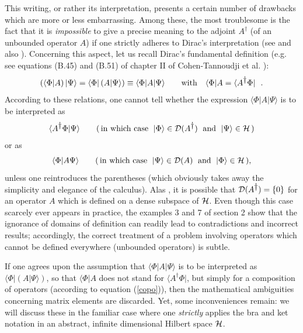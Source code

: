 \documentclass[12pt]{report}
\begin{document}
This writing, or rather its interpretation, 
presents a certain number of drawbacks 
which are more or less embarrassing. 
Among these, the most troublesome is the fact that it is 
{\em impossible} to give a precise meaning to the adjoint 
$A^{\dag}$ (of an unbounded operator $A$) if one strictly adheres
to Dirac's interpretation (see \cite{grau} and also \cite{fano}).
Concerning this aspect, let us recall Dirac's fundamental definition 
(e.g. see equations (B.45)
and (B.51) of chapter II of Cohen-Tannoudji et al. \cite{ct}):
\begin{equation}
\label{cohe}
\left( \langle \Phi | A \right) | \Psi \rangle =
\langle \Phi | \left( A  | \Psi \rangle \right) \equiv
\langle \Phi |  A  | \Psi \rangle
\qquad {\rm with} \quad
\langle \Phi | A  = \langle A^{\dag} \Phi |
\ \ .
\end{equation}
According to these relations, one cannot tell whether 
the expression 
$\langle \Phi |  A  | \Psi \rangle$ 
is to be interpreted as
\[
\langle  A^{\dag} \Phi | \Psi \rangle
\qquad
(\, \mbox{in which case} \ \; |\Phi \rangle \in {\cal D} (A^{\dag})
\ \; {\rm and} \ \; | \Psi \rangle \in \hs \, )
\]
or as 
\[
\langle \Phi | A   \Psi \rangle
\qquad
(\, \mbox{in which case} \ \; |\Psi \rangle \in {\cal D} (A) \
\; {\rm and} \ \; | \Phi \rangle \in \hs \, ),
\]
unless one reintroduces the parentheses (which obviously 
takes away the simplicity and elegance of the calculus). 
Alas \cite{rs}, it is possible that 
${\cal D}(A^{\dag}) = \{ 0 \}$
for an operator $A$ which is defined on a dense subspace of $\hs$.
Even though this case scarcely ever appears in practice, 
the examples 3
and 7 of section 2 show that the ignorance of
domains of definition can 
readily lead to contradictions and incorrect results; 
accordingly, the 
correct treatment of a problem involving operators 
which cannot be defined everywhere (unbounded operators)
is subtle. 

If one agrees upon the assumption that  
$\langle \Phi |  A  | \Psi \rangle$ 
 is to be interpreted as 
$\langle \Phi | \left( A  | \Psi \rangle \right)$, so that 
$\langle \Phi |A$ does not stand for $\langle A^{\dag} \Phi |$, 
but simply for a composition of operators
(according to equation (\ref{copo})), 
then the mathematical ambiguities concerning matrix elements are 
discarded. Yet, some 
inconveniences remain: 
we will discuss these in the 
familiar case where one {\em strictly} 
applies the bra and ket notation 
in an abstract, infinite dimensional Hilbert space $\hs$. 
 
\end{document}
